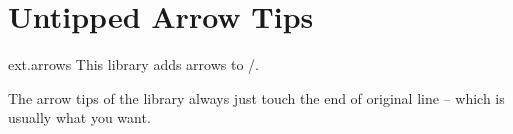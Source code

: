 %
%
%

\section{Untipped Arrow Tips}
\label{pgflibrary:arrows}
\tikzset{external/export/.try=false}%
\begin{pgflibrary}{ext.arrows}
  This library adds arrows to \pgfname/\tikzname.
\end{pgflibrary}

The arrow tips of the  library always
just touch the end of original line -- which is usually
what you want.

